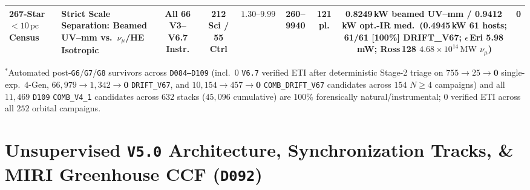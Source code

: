\documentclass[twocolumn,10pt]{article}
\begin{document}
\begin{table}[p]
{\begin{tabular}{llccccccc}
\midrule
\textbf{267-Star $<10\,\text{pc}$ Census} & \textbf{Strict Scale Separation: Beamed UV--mm vs.\ $\nu_\mu$/HE Isotropic} & \textbf{All 66 V3--V6.7 Instr.} & \textbf{212 Sci / 55 Ctrl} & $\mathbf{1.30\text{--}9.99}$ & \textbf{260--9940} & \textbf{121 pl.} & \textbf{0.8249\,kW beamed UV--mm / 0.9412\,kW opt.-IR med.\ (0.4945\,kW 61 hosts; 61/61 [100\%] DRIFT\_V67; $\epsilon$\,Eri 5.98\,mW; Ross\,128 $4.68\times 10^{14}\,\mathrm{MW}$ $\nu_\mu$)} & \textbf{0} \\
\bottomrule
\end{tabular}%
}
\par\smallskip\scriptsize{$^{\ast}$Automated post-\texttt{G6}/\texttt{G7}/\texttt{G8} survivors across \texttt{D084--D109} (incl.\ $0$ \texttt{V6.7} verified ETI after deterministic Stage-2 triage on $755\rightarrow 25\rightarrow \mathbf{0}$ single-exp.\ 4-Gen, $66{,}979\rightarrow 1{,}342\rightarrow \mathbf{0}$ \texttt{DRIFT\_V67}, and $10{,}154\rightarrow 457\rightarrow \mathbf{0}$ \texttt{COMB\_DRIFT\_V67} candidates across $154$ $N\ge 4$ campaigns) and all $11{,}469$ \texttt{D109} \texttt{COMB\_V4\_1} candidates across $632$ stacks ($45{,}096$ cumulative) are 100\% forensically natural/instrumental; $0$ verified ETI across all $252$ orbital campaigns.}
\end{table}

\section{Unsupervised \texttt{V5.0} Architecture, Synchronization Tracks, \& MIRI Greenhouse CCF (\texttt{D092})}
\end{document}
